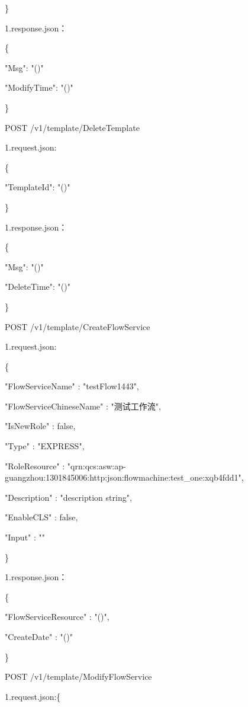 \}

1.response.json：

\{

    "Msg": "\@exists()"

    "ModifyTime": "\@exists()"

\}

POST /v1/template/DeleteTemplate

1.request.json:

\{

    "TemplateId": "\@exists()"

\}

1.response.json：

\{

    "Msg": "\@exists()"

    "DeleteTime": "\@exists()"

\}


POST /v1/template/CreateFlowService

1.request.json:

\{

"FlowServiceName"        : "testFlow1443",

"FlowServiceChineseName" : "测试工作流",


"IsNewRole"              : false,

"Type"                   : "EXPRESS",

"RoleResource"           : "qrn:qcs:asw:ap-guangzhou:1301845006:http:json:flowmachine:test\_one:xqb4fdd1",

"Description"            : "description string",

"EnableCLS"              : false,

"Input"                  : ""

\}

1.response.json：

\{

"FlowServiceResource"   : "\@exists()",

"CreateDate"            : "\@exists()"

\}



POST /v1/template/ModifyFlowService

1.request.json:\{

